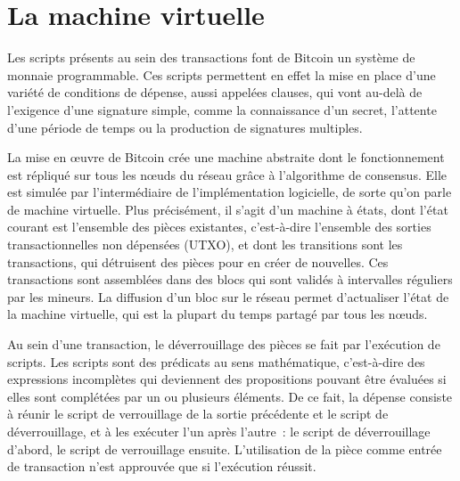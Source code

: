 \section*{La machine virtuelle}

Les scripts présents au sein des transactions font de Bitcoin un système de monnaie programmable. Ces scripts permettent en effet la mise en place d'une variété de conditions de dépense, aussi appelées clauses, qui vont au-delà de l'exigence d'une signature simple, comme la connaissance d'un secret, l'attente d'une période de temps ou la production de signatures multiples.

La mise en œuvre de Bitcoin crée une machine abstraite dont le fonctionnement est répliqué sur tous les nœuds du réseau grâce à l'algorithme de consensus. Elle est simulée par l'intermédiaire de l'implémentation logicielle, de sorte qu'on parle de machine virtuelle. Plus précisément, il s'agit d'un machine à états, dont l'état courant est l'ensemble des pièces existantes, c'est-à-dire l'ensemble des sorties transactionnelles non dépensées (UTXO), et dont les transitions sont les transactions, qui détruisent des pièces pour en créer de nouvelles. Ces transactions sont assemblées dans des blocs qui sont validés à intervalles réguliers par les mineurs. La diffusion d'un bloc sur le réseau permet d'actualiser l'état de la machine virtuelle, qui est la plupart du temps partagé par tous les nœuds.


Au sein d'une transaction, le déverrouillage des pièces se fait par l'exécution de scripts. Les scripts sont des prédicats au sens mathématique, c'est-à-dire des expressions incomplètes qui deviennent des propositions pouvant être évaluées si elles sont complétées par un ou plusieurs éléments. De ce fait, la dépense consiste à réunir le script de verrouillage de la sortie précédente et le script de déverrouillage, et à les exécuter l'un après l'autre~: le script de déverrouillage d'abord, le script de verrouillage ensuite. L'utilisation de la pièce comme entrée de transaction n'est approuvée que si l'exécution réussit.

